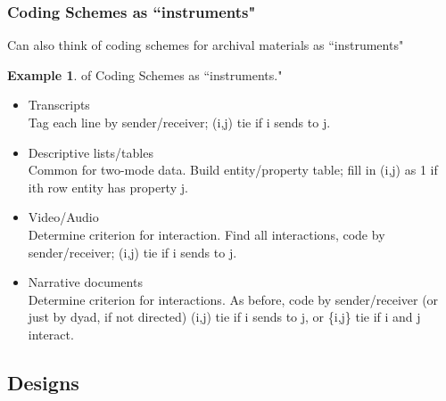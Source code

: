 \documentclass[]{book}
\theoremstyle{definition}
\theoremstyle{definition}
\newtheorem{example}{Example}[chapter]
\theoremstyle{definition}
\theoremstyle{remark}
\begin{document}
\subsubsection{Coding Schemes as ``instruments" }

Can also think of coding schemes for archival materials as
``instruments"

\begin{example}\label{csinst} of Coding Schemes as ``instruments."


\begin{itemize}
\item Transcripts \\

Tag each line by sender/receiver; (i,j) tie if i sends to j.\\

\item Descriptive lists/tables \\

Common for two-mode data. Build entity/property table; fill in (i,j) as 1 if ith row entity has 
property j.\\ 
 
\item Video/Audio \\

Determine criterion for interaction. Find all interactions, code by sender/receiver; (i,j) tie if i sends to j.\\ 
 
\item Narrative documents \\

Determine criterion for interactions. As before, code by sender/receiver (or just by dyad, if not directed)  (i,j) tie if i sends to j, or \{i,j\} tie if i and j interact.
\end{itemize}
\end{example}

\subsection{Designs}
\end{document}
